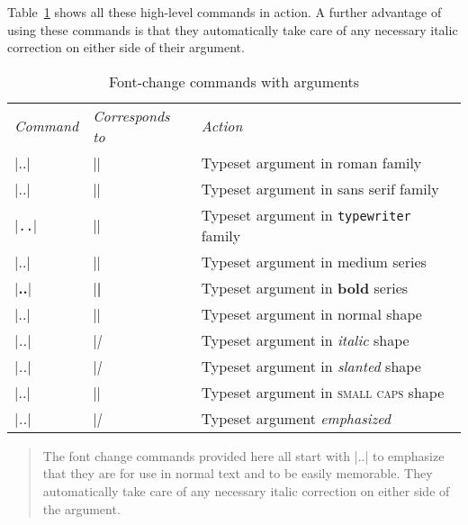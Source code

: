  Table~\ref{tab:fontcmds} shows all these high-level commands in
 action.  A further advantage of using these commands is that they
 automatically take care of any necessary italic correction on either
 side of their argument.
 \begin{table}[t]
 \begin{center}
 \begin{tabular}{lll}
 \textit{Command} & \textit{Corresponds to }& \textit{Action} \\[4pt]
 |\textrm{..}| & |\rmfamily| &
            Typeset argument in roman family  \\
 |\textsf{..}| & |\sffamily| &
            Typeset argument in \textsf{sans serif} family  \\
 |\texttt{..}| & |\ttfamily| &
            Typeset argument in \texttt{typewriter} family
                                                            \\[2pt]
 |\textmd{..}| & |\mdseries| &
             Typeset argument in medium series    \\
 |\textbf{..}| & |\bfseries| &
             Typeset argument in \textbf{bold} series    \\[2pt]
 |\textup{..}| & |\upshape| &
             Typeset argument in normal shape  \\
 |\textit{..}| & |\itshape| &
             Typeset argument in \textit{italic} shape  \\
 |\textsl{..}| & |\slshape| &
             Typeset argument in \textsl{slanted} shape  \\
 |\textsc{..}| & |\scshape| &
             Typeset argument in \textsc{small caps} shape
                                                            \\[2pt]
 |\emph{..}| & |\em| &
              Typeset argument \emph{emphasized}
 \end{tabular}
 \end{center}
 \caption{Font-change commands with arguments}
 \label{tab:fontcmds}
 \begin{quote}
 The font change commands provided here
 all start with |\text..| to emphasize that they
 are for use in normal text and to be easily memorable. They
 automatically take care of any necessary italic correction on either
 side of the argument.
 \end{quote}
 \end{table}


